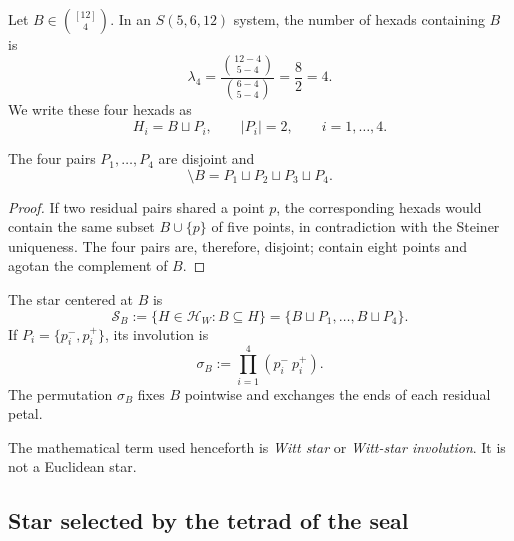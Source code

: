 Let \(B\in\binom{[12]}4\). In an \(S(5,6,12)\) system, the number of
hexads containing \(B\) is
\begin{equation}
 \lambda_4
 =\frac{\binom{12-4}{5-4}}{\binom{6-4}{5-4}}
 =\frac82=4.
 \label{p12-83-c20-s2:eq:lambda-cuatro-w12}
\end{equation}
We write these four hexads as
\[
 H_i=B\sqcup P_i,
 \qquad |P_i|=2,
 \qquad i=1,\ldots,4.
\]

\begin{lemma}
\label{p12-83-c20-s2:lem:particion-residual-tetrada-witt}
The four pairs \(P_1,\ldots,P_4\) are disjoint and
\begin{equation}
 [12]\setminus B
 =P_1\sqcup P_2\sqcup P_3\sqcup P_4.
 \label{p12-83-c20-s2:eq:particion-residual-tetrada-witt}
\end{equation}
\end{lemma}

\begin{proof}
If two residual pairs shared a point \(p\), the corresponding
hexads would contain the same subset \(B\cup\{p\}\) of five points,
in contradiction with the Steiner uniqueness. The four pairs are, therefore,
disjoint; contain eight points and agotan the complement of \(B\).
\end{proof}

\begin{definition}
\label{p12-83-c20-s2:def:estrella-witt-involucion}
The star centered at \(B\) is
\begin{equation}
 \mathscr S_B
 :=\{H\in\mathcal H_W:B\subseteq H\}
 =\{B\sqcup P_1,\ldots,B\sqcup P_4\}.
 \label{p12-83-c20-s2:eq:estrella-witt-general}
\end{equation}
If \(P_i=\{p_i^-,p_i^+\}\), its involution is
\begin{equation}
 \sigma_B:=\prod_{i=1}^{4}(p_i^-\ p_i^+).
 \label{p12-83-c20-s2:eq:involucion-estrella-witt-general}
\end{equation}
The permutation \(\sigma_B\) fixes \(B\) pointwise and exchanges the
ends of each residual petal.
\end{definition}

The mathematical term used henceforth is \emph{Witt star} or
\emph{Witt-star involution}. It is not a Euclidean
star.

\subsection{Star selected by the tetrad of the seal}

